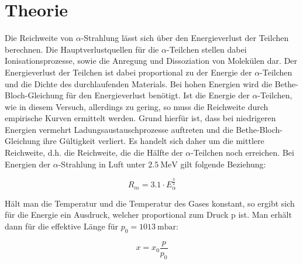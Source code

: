 \section{Theorie}
\label{sec:Theorie}

Die Reichweite von $\alpha$-Strahlung lässt sich über den Energieverlust der Teilchen berechnen.
Die Hauptverlustquellen für die $\alpha$-Teilchen stellen dabei Ionisationsprozesse, sowie die Anregung und Dissoziation von Molekülen dar.
Der Energieverlust der Teilchen ist dabei proportional zu der Energie der $\alpha$-Teilchen und die Dichte des durchlaufenden Materials.
Bei hohen Energien wird die Bethe-Bloch-Gleichung für den Energieverlust benötigt.
Ist die Energie der $\alpha$-Teilchen, wie in diesem Versuch, allerdings zu gering, so muss die Reichweite durch empirische Kurven ermittelt werden.
Grund hierfür ist, dass bei niedrigeren Energien vermehrt Ladungsaustauschprozesse auftreten und die Bethe-Bloch-Gleichung ihre Gültigkeit verliert.
Es handelt sich daher um die mittlere Reichweite, d.h. die Reichweite, die die Hälfte der $\alpha$-Teilchen noch erreichen.
Bei Energien der $\alpha$-Strahlung in Luft unter $\SI{2.5}{\mega\electronvolt}$ gilt folgende Beziehung:

\begin{equation}
  R_m = 3.1 \cdot E_{\alpha}^{\frac{3}{2}}
\end{equation}

Hält man die Temperatur und die Temperatur des Gases konstant, so ergibt sich für die Energie ein Ausdruck, welcher proportional zum Druck p ist.
Man erhält dann für die effektive Länge für $p_0 = \SI{1013}{\milli\bar}$:

\begin{equation}
  x = x_0 \frac{p}{p_0}
\end{equation}



\cite{1}
